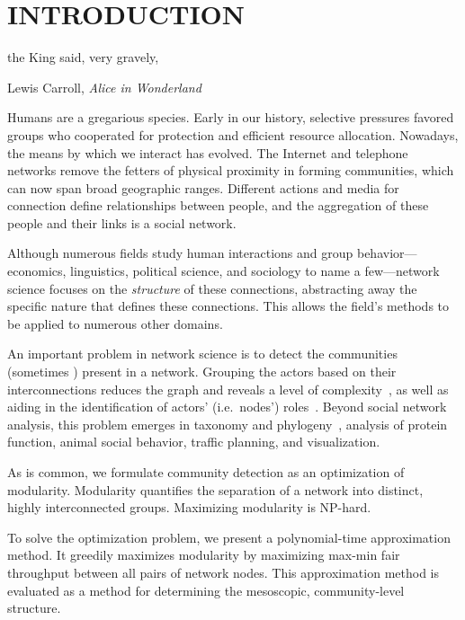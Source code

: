 
\chapter{INTRODUCTION} \label{ch:introduction}%

\epigraph{ the King said, very gravely, }{Lewis Carroll, \emph{Alice in Wonderland}}

\noindent Humans are a gregarious species. Early in our history, selective pressures favored groups who cooperated for protection and efficient resource allocation. Nowadays, the means by which we interact has evolved. The Internet and telephone networks remove the fetters of physical proximity in forming communities, which can now span broad geographic ranges. Different actions and media for connection define relationships between people, and the aggregation of these people and their links is a social network.

Although numerous fields study human interactions and group behavior---economics, linguistics, political science, and sociology to name a few---network science focuses on the \emph{structure} of these connections, abstracting away the specific nature that defines these connections. This allows the field's methods to be applied to numerous other domains.

An important problem in network science is to detect the communities (sometimes ) present in a network. Grouping the actors based on their interconnections reduces the graph and reveals a  level of complexity~\cite{yang2016comparative}, as well as aiding in the identification of actors' (i.e.\ nodes') roles~\cite{guimera2005functional}. Beyond social network analysis, this problem emerges in taxonomy and phylogeny~\cite{jardine1971mathematical}, analysis of protein function, animal social behavior, traffic planning, and visualization.

As is common, we formulate community detection as an optimization of modularity. Modularity quantifies the separation of a network into distinct, highly interconnected groups. Maximizing modularity is NP-hard.

To solve the optimization problem, we present a polynomial-time approximation method. It greedily maximizes modularity by maximizing max-min fair throughput between all pairs of network nodes. This approximation method is evaluated as a method for determining the mesoscopic, community-level structure. 

